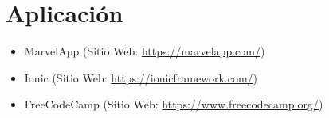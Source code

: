         \section{Aplicación}
        
            \begin{itemize} [label=•]
                \setlength{\itemindent}{3em}
                \item MarvelApp (Sitio Web: \href{https://marvelapp.com/}{https://marvelapp.com/})
                \item Ionic (Sitio Web: \href{https://ionicframework.com/}{https://ionicframework.com/})
                \item FreeCodeCamp (Sitio Web: \href{https://www.freecodecamp.org/}{https://www.freecodecamp.org/})
            \end{itemize}
            
